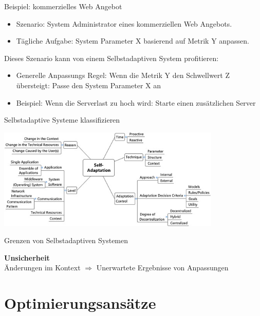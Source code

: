 \documentclass[de,16:9]{sdqbeamer}
\begin{document}
\begin{frame}{Beispiel: kommerzielles Web Angebot}
	\begin{itemize}
		\item Szenario: System Administrator eines kommerziellen Web Angebots.
		\item Tägliche Aufgabe: System Parameter X basierend auf Metrik Y anpassen.
	\end{itemize}
	\medskip
	Dieses Szenario kann von einem Selbstadaptiven System profitieren:
	\begin{itemize}
		\item Generelle Anpassungs Regel:
		Wenn die Metrik Y den Schwellwert Z übersteigt: Passe den System Parameter X an
		\item Beispiel: Wenn die Serverlast zu hoch wird: Starte einen zusätzlichen Server
	\end{itemize}
\end{frame}

\begin{frame}{Selbstadaptive Systeme klassifizieren}
	\begin{center}
		\includegraphics[width=0.8\textwidth]{sources/KrupitzerTaxonomy.jpg}
		\cite{SurveyOnEngineeringApproaches}
	\end{center}
\end{frame}

\begin{frame}{Grenzen von Selbstadaptiven Systemen}
	\begin{center}
		\Large \textbf{Unsicherheit}
		\\ \medskip
		Änderungen im Kontext $\Rightarrow$ Unerwartete Ergebnisse von Anpassungen
	\end{center}
\end{frame}

\section{Optimierungsansätze}
\end{document}
